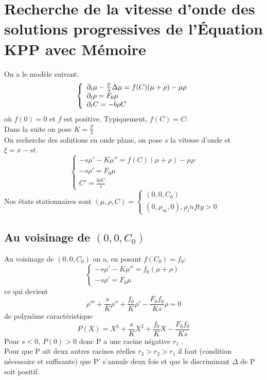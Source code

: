 \section{Recherche de la vitesse d'onde des solutions progressives de l’Équation KPP avec Mémoire}
On a le modèle suivant: 
\begin{equation} \left\{
                \begin{array}{ll}
                   \partial_t\mu -\frac{T}{\lambda}\Delta\mu = f(C)(\mu + \rho) -\mu\rho\\
                 \partial_t\rho=  F_0 \mu \\
                  \partial_t C = -b\rho C
                \end{array}
              \right.
\end{equation} 
où $f(0)=0$ et $f$ est positive. Typiquement, $f(C)=C$:\\
Dans la suite on pose $K= \frac{T}{\lambda}$\\
On recherche des solutions en onde plane, on pose $s$ la vitesse d'onde et $\xi = x - st$. \\
\begin{equation} \left\{ \begin{array}{ll} -s \mu'-K\mu''=f(C)(\mu+\rho)-\mu\rho \\ -s\rho' = F_0\mu  \\C'=\frac{b\rho C}{s} \end{array}\right.
\end{equation}
Nos états stationnaires sont $(\mu,\rho,C) = \left\{ \begin{array}{ll} (0,0,C_0) \\
 (0,\rho_\infty,0) , \rho_infty > 0 \end{array} \right.$ 
\subsection{Au voisinage de $(0,0,C_0)$}
Au voisinage de $(0,0,C_0)$ on a, en posant $f(C_0)=f_0$:
\begin{equation} \left\{ \begin{array}{ll} -s \mu'-K\mu''=f_0(\mu+\rho) \\ -s\rho' = F_0\mu   \end{array}\right.
\end{equation} ce qui devient  \begin{equation} \rho''' +\frac{s}{K}\rho''+\frac{f_0}{K}\rho'-\frac{F_0f_0}{Ks}\rho =0 \end{equation} de polynôme caractéristique \begin{equation} P(X)= X^3 +\frac{s}{K}X^2+\frac{f_0}{K}X-\frac{F_0f_0}{Ks} \end{equation}
Pour $s<0$,   $P(0)>0$ donc P a une racine négative $r_1$ .\\
Pour que P ait deux autres racines réelles $r_3>r_2>r_1$ il faut (condition nécessaire et suffisante) que P' s'annule deux fois et que le discriminant $\Delta$ de P soit positif.
